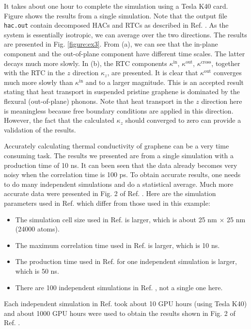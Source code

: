 \documentclass[12pt,a4paper]{report}
\begin{document}
It takes about one hour to complete the simulation using a Tesla K40 card.
Figure shows the results from a single simulation. Note that the output file \verb"hac.out" contain decomposed HACs and RTCs as described in Ref. \cite{fan2017prb}. As the system is essentially isotropic, we can average over the two directions. The results are presented in Fig. \ref{figure:ex3}. From (a), we can see that the in-plane component and the out-of-plane component have different time scales. The latter decays much more slowly. In (b), the RTC components $\kappa^{\text{in}}$, $\kappa^{\text{out}}$, $\kappa^{\text{cross}}$, together with the RTC in the $z$ direction $\kappa_z$, are presented. It is clear that $\kappa^{\text{out}}$ converges much more slowly than $\kappa^{\text{in}}$ and to a larger magnitude. This is an accepted result stating that heat transport in suspended pristine graphene is dominated by the flexural (out-of-plane) phonons. Note that heat transport in the $z$ direction here is meaningless because free boundary conditions are applied in this direction. However, the fact that the calculated $\kappa_z$ should converged to zero can provide a validation of the results.


Accurately calculating thermal conductivity of graphene can be a very time consuming task. The results we presented are from a single simulation with a production time of 10 ns. It can been seen that the data already becomes very noisy when the correlation time is 100 ps. To obtain accurate results, one needs to do many independent simulations and do a statistical average. Much more accurate data were presented in Fig. 2 of Ref. \cite{fan2017prb}. Here are the simulation parameters used in Ref. \cite{fan2017prb} which differ from those used in this example:
\begin{itemize}
\item The simulation cell size used in Ref. \cite{fan2017prb} is larger, which is about 25 nm $\times$ 25 nm (24000 atoms).
\item The maximum correlation time used in Ref. \cite{fan2017prb} is larger, which is 10 ns.
\item The production time used in Ref. \cite{fan2017prb} for one independent simulation is larger, which is 50 ns.
\item There are 100 independent simulations in Ref. \cite{fan2017prb}, not a single one here.
\end{itemize}

Each independent simulation in Ref. \cite{fan2017prb} took about 10 GPU hours (using Tesla K40) and about 1000 GPU hours were used to obtain the results shown in Fig. 2 of Ref. \cite{fan2017prb}.
\end{document}
